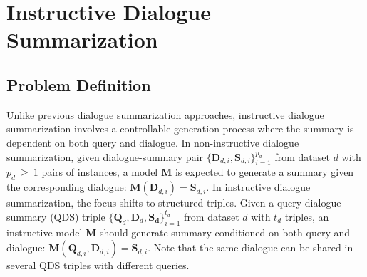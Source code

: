 \documentclass[11pt]{article}
\begin{document}
\section{Instructive Dialogue Summarization} 

    \subsection{Problem Definition}

        Unlike previous dialogue summarization approaches, instructive dialogue summarization involves a controllable generation process where the summary is dependent on both query and dialogue. In non-instructive dialogue summarization, given dialogue-summary pair $\{\bm{D}_{d,i},\bm{S}_{d,i}\}_{i=1}^{p_d}$ from dataset $d$ with $p_d~\geq~1$ pairs of instances, a model $\mathbf{M}$ is expected to generate a summary given the corresponding dialogue: $\mathbf{M}(\bm{D}_{d,i})=\bm{S}_{d,i}$. In instructive dialogue summarization, the focus shifts to structured triples. Given a query-dialogue-summary (QDS) triple $\{\bm{Q}_d,\bm{D}_d,\bm{S_d}\}_{i=1}^{t_d}$ from dataset $d$ with $t_d$ triples, an instructive model $\bm{M}$ should generate summary conditioned on both query and dialogue: $\bm{M}(\bm{Q}_{d,i},\bm{D}_{d,i})=\bm{S}_{d,i}$. Note that the same dialogue can be shared in several QDS triples with different queries.
\end{document}
